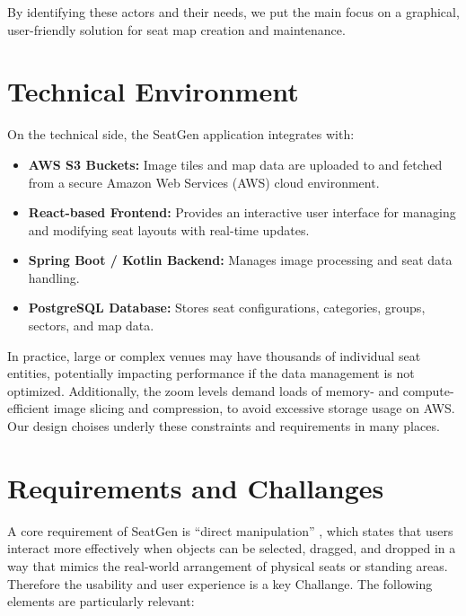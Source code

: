 By identifying these actors and their needs, we put the main focus on a graphical, user-friendly solution for seat map creation and maintenance.

\section{Technical Environment}
On the technical side, the SeatGen application integrates with:
\begin{itemize}
    \item \textbf{AWS S3 Buckets:} Image tiles and map data are uploaded to and fetched from a secure Amazon Web Services (AWS) cloud environment.
    \item \textbf{React-based Frontend:} Provides an interactive user interface for managing and modifying seat layouts with real-time updates.  
    \item \textbf{Spring Boot / Kotlin Backend:} Manages image processing and seat data handling.  
    \item \textbf{PostgreSQL Database:} Stores seat configurations, categories, groups, sectors, and map data.  
\end{itemize}

In practice, large or complex venues may have thousands of individual seat entities, potentially impacting performance if the data management is not optimized. Additionally, the zoom levels demand loads of memory- and compute-efficient image slicing and compression, to avoid excessive storage usage on AWS. Our design choises underly these constraints and requirements in many places.

\section{Requirements and Challanges}
A core requirement of SeatGen is “direct manipulation” \cite{Hutchins01121985}, which states that users interact more effectively when objects can be selected, dragged, and dropped in a way that mimics the real-world arrangement of physical seats or standing areas. Therefore the usability and user experience is a key Challange. The following elements are particularly relevant:

